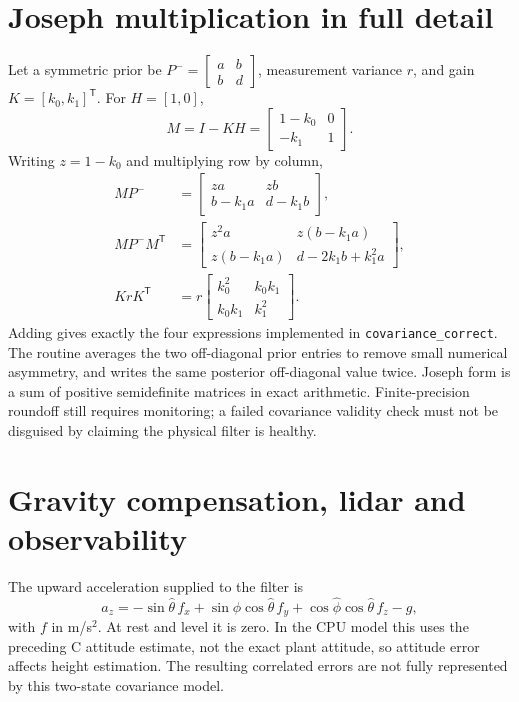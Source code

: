 \section{Joseph multiplication in full detail}
Let a symmetric prior be $P^-=\begin{bmatrix}a&b\\b&d\end{bmatrix}$,
measurement variance $r$, and gain $K=[k_0,k_1]^{\mathsf T}$.
For $H=[1,0]$,
\begin{equation}
M=I-KH=\begin{bmatrix}1-k_0&0\\-k_1&1\end{bmatrix}.
\end{equation}
Writing $z=1-k_0$ and multiplying row by column,
\begin{align}
MP^-&=\begin{bmatrix}za&zb\\b-k_1a&d-k_1b\end{bmatrix},\\
MP^-M^{\mathsf T}&=\begin{bmatrix}
z^2a&z(b-k_1a)\\z(b-k_1a)&d-2k_1b+k_1^2a
\end{bmatrix},\\
KrK^{\mathsf T}&=r\begin{bmatrix}k_0^2&k_0k_1\\k_0k_1&k_1^2\end{bmatrix}.
\end{align}
Adding gives exactly the four expressions implemented in
\texttt{covariance\_correct}. The routine averages the two off-diagonal
prior entries to remove small numerical asymmetry, and writes the same
posterior off-diagonal value twice. Joseph form is a sum of positive
semidefinite matrices in exact arithmetic. Finite-precision roundoff still
requires monitoring; a failed covariance validity check must not be disguised
by claiming the physical filter is healthy.

\section{Gravity compensation, lidar and observability}
The upward acceleration supplied to the filter is
\begin{equation}
a_z=-\sin\hat\theta\,f_x
 +\sin\hat\phi\cos\hat\theta\,f_y
 +\cos\hat\phi\cos\hat\theta\,f_z-g,
\end{equation}
with $f$ in m/s$^2$. At rest and level it is zero. In the CPU model this
uses the preceding C attitude estimate, not the exact plant attitude, so
attitude error affects height estimation. The resulting correlated errors
are not fully represented by this two-state covariance model.

